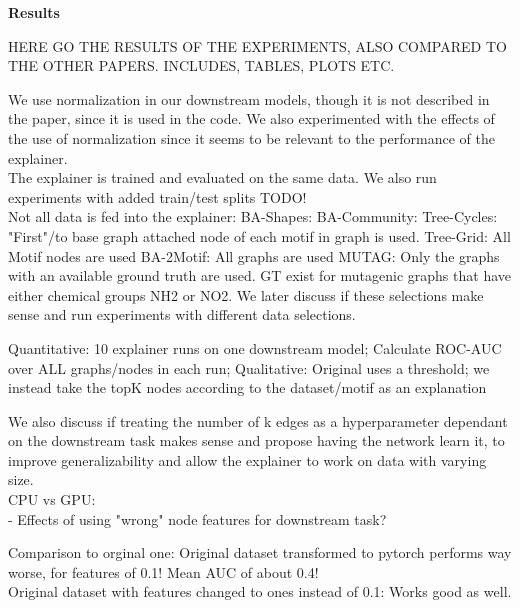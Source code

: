 \textbf{Results}

HERE GO THE RESULTS OF THE EXPERIMENTS, ALSO COMPARED TO THE OTHER PAPERS. INCLUDES, TABLES, PLOTS ETC.

We use normalization in our downstream models, though it is not described in the paper, since it is used in the code. We also experimented with the effects of the use of normalization since it seems to be relevant to the performance of the explainer. \\
The explainer is trained and evaluated on the same data. We also run experiments with added train/test splits TODO! \\
Not all data is fed into the explainer:
BA-Shapes: 
BA-Community:
Tree-Cycles: "First"/to base graph attached node of each motif in graph is used.
Tree-Grid: All Motif nodes are used
BA-2Motif: All graphs are used
MUTAG: Only the graphs with an available ground truth are used. GT exist for mutagenic graphs that have either chemical groups NH2 or NO2.
We later discuss if these selections make sense and run experiments with different data selections.

Quantitative: 10 explainer runs on one downstream model; Calculate ROC-AUC over ALL graphs/nodes in each run;
Qualitative: Original uses a threshold; we instead take the topK nodes according to the dataset/motif as an explanation

We also discuss if treating the number of k edges as a hyperparameter dependant on the downstream task makes sense and propose having the network learn it, to improve generalizability and allow the explainer to work on data with varying size. \\

CPU vs GPU: \\
- Effects of using "wrong" node features for downstream task?

Comparison to orginal one: Original dataset transformed to pytorch performs way worse, for features of 0.1! Mean AUC of about 0.4! \\
Original dataset with features changed to ones instead of 0.1: Works good as well.

